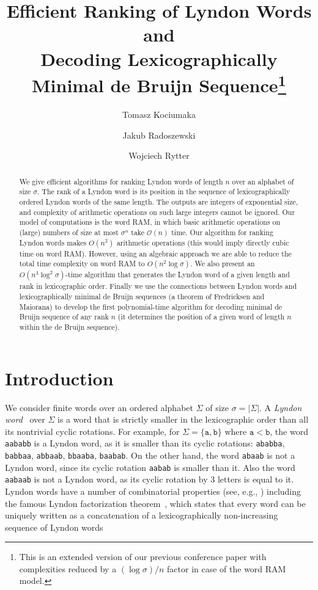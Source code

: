 \documentclass{article}
\author{Tomasz Kociumaka}
\author{Jakub Radoszewski}
\author{Wojciech Rytter}
\affil{Institute of Informatics, University of Warsaw, Poland}
\affil[]{\texttt{[kociumaka,jrad,rytter]@mimuw.edu.pl}}
\date{\vspace{-1cm}}
\title{
Efficient Ranking of Lyndon Words and\\ Decoding
Lexicographically Minimal de Bruijn Sequence\footnote{
This is an extended version of our previous conference paper \cite{DBLP:conf/cpm/KociumakaRR14} with complexities reduced
by a $(\log\sigma)/n$ factor in case of the word RAM model.
}
   }
\newcommand{\Oh}{\mathcal{O}}
\theoremstyle{definition}
\theoremstyle{remark}
\begin{document}
\maketitle
\begin{abstract}
We give efficient algorithms for ranking Lyndon words of length $n$ over
an alphabet of size $\sigma$. The rank of a Lyndon word is its position
in the sequence of lexicographically ordered Lyndon words of the same length.
The outputs are integers of exponential size, and
complexity of arithmetic operations on such large integers cannot be ignored.
Our model of computations is the word RAM, in which  basic arithmetic operations on
(large) numbers of size at most $\sigma^n$ take $\Oh(n)$ time.
Our algorithm for ranking Lyndon words makes $O(n^2)$ arithmetic operations
(this would imply directly cubic time on word RAM).
However, using an algebraic approach we
are able to reduce the total time complexity on word RAM to $O(n^2 \log\sigma)$.
We also present an $O(n^3 \log^2 \sigma)$-time algorithm that generates the Lyndon
word of a given length and rank in lexicographic order.
Finally we use the connections between Lyndon words and lexicographically minimal de Bruijn sequences
(a theorem of Fredricksen and Maiorana) to develop the first polynomial-time algorithm
for decoding minimal de Bruijn sequence of any rank $n$
(it determines the position of a given word of length $n$ within the de Bruijn sequence).
\end{abstract}


\section{Introduction}
We consider finite words over an ordered alphabet $\Sigma$ of size $\sigma=|\Sigma|$.
A \emph{Lyndon word}~\cite{Lyndon1954,chen1958free} over $\Sigma$ is a word that is strictly smaller in the lexicographic order than all its
nontrivial cyclic rotations.
For example, for $\Sigma=\{\mathtt{a},\mathtt{b}\}$ where $\mathtt{a}<\mathtt{b}$, the word \texttt{aababb} is a Lyndon word,
as it is smaller than its cyclic rotations: \texttt{ababba}, \texttt{babbaa}, \texttt{abbaab},
\texttt{bbaaba}, \texttt{baabab}.
On the other hand, the word \texttt{abaab} is not a Lyndon word, since its cyclic rotation \texttt{aabab}
is smaller than it.
Also the word \texttt{aabaab} is not a Lyndon word, as its cyclic rotation by 3 letters is equal to it.
Lyndon words have a number of combinatorial properties (see, e.g., \cite{Lothaire}) including the famous Lyndon
factorization theorem~\cite{chen1958free}, which states that every word can be uniquely written
as a concatenation of a lexicographically non-increasing sequence of Lyndon words
\end{document}
